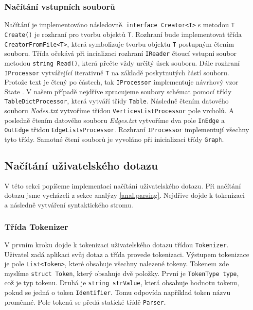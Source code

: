 \subsubsection{Načítání vstupních souborů}

Načítání je implementováno následovně.
\texttt{interface Creator<T>} s metodou \texttt{T Create()} je rozhraní pro tvorbu objektů \texttt{T}.
Rozhraní bude implementovat třída \texttt{CreatorFromFile<T>}, která symbolizuje tvorbu objektu \texttt{T} postupným čtením souboru.
Třída očekává při incializaci rozhraní \texttt{IReader} čtoucí vstupní soubor metodou \texttt{string Read()}, která přečte vždy určitý úsek souboru.
Dále rozhraní \texttt{IProcessor} vytvářející iterativně \texttt{T} na základě poskytnutých částí souboru.
Protože text je čtený po částech, tak \texttt{IProcessor} implementuje návrhový vzor State \citep[str. 305]{patterns}.
V našem případě nejdříve zpracujeme soubory schémat pomocí třídy \texttt{TableDictProcessor}, která vytváří třídy \texttt{Table}.
Následně čtením datového souboru \textit{Nodes.txt} vytvoříme třídou \texttt{VerticesListProcessor} pole vrcholů.
A posledně čtením datového souboru \textit{Edges.txt} vytvoříme dva pole \texttt{InEdge} a \texttt{OutEdge} třidou \texttt{EdgeListsProcessor}. 
Rozhraní \texttt{IProcessor} implementují všechny tyto třídy.
Samotné čtení souborů je vyvoláno při inicializaci třídy \texttt{Graph}.

\subsection{Načítání uživatelského dotazu} \label{impl.parsing}

V této sekci popíšeme implementaci načítání uživatelského dotazu.
Při načítání dotazu jsme vycházeli z sekce analýzy \ref{anal.parsing}.
Nejdřive dojde k tokenizaci a následně vytváření syntaktického stromu.

\subsubsection{Třída Tokenizer}

V prvním kroku dojde k tokenizaci uživatelského dotazu třídou \texttt{Tokenizer}.
Uživatel zadá aplikaci svůj dotaz a třída provede tokenizaci.
Výstupem tokenizace je pole \texttt{List<Token>}, které obsahuje všechny nalezené tokeny.
Tokenem zde myslíme \texttt{struct Token}, který obsahuje dvě položky.
První je \texttt{TokenType type}, což je typ tokenu.
Druhá je \texttt{string strValue}, která obsahuje hodnotu tokenu, pokud se jedná o token \texttt{Identifier}.
Tomu odpovída například token názvu proměnné.
Pole tokenů se předá statické třídě \texttt{Parser}.

